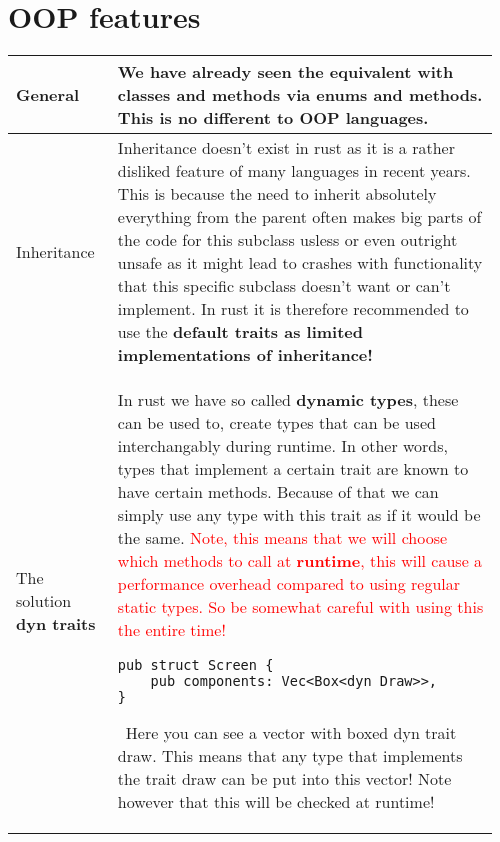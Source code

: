 \documentclass[main.tex,fontsize=8pt,paper=a4,paper=portrait,DIV=calc,]{scrartcl}
\begin{document}
\begin{table}[ht!]
\section{OOP features}
\begin{tabular}{|m{0.2\linewidth}|m{0.755\linewidth}|}
\hline 
General & 
We have already seen the equivalent with classes and methods via enums and methods.\newline
This is no different to OOP languages.\\
\hline
Inheritance & 
Inheritance doesn't exist in rust as it is a rather disliked feature of many languages in recent years.\newline
This is because the need to inherit absolutely everything from the parent often makes big parts of the code for this subclass usless or even outright unsafe as it might lead to crashes with functionality that this specific subclass doesn't want or can't implement.\newline
In rust it is therefore recommended to use the \textbf{default traits as limited implementations of inheritance!}\\
\hline
The solution \textbf{dyn traits}& 
\textcolor{OliveGreen}{In rust we have so called \textbf{dynamic types}, these can be used to, create types that can be used interchangably during runtime. In other words, types that implement a certain trait are known to have certain methods. Because of that we can simply use any type with this trait as if it would be the same.}\newline
\textcolor{red}{Note, this means that we will choose which methods to call at \textbf{runtime}, this will cause a performance overhead compared to using regular static types. So be somewhat careful with using this the entire time!}\newline 
\begin{lstlisting}
pub struct Screen {
    pub components: Vec<Box<dyn Draw>>,
}
\end{lstlisting} 
\, \newline
Here you can see a vector with boxed dyn trait draw.\newline
This means that any type that implements the trait draw can be put into this vector!\newline
Note however that this will be checked at runtime!\\
\hline
\end{tabular}
\end{table}
\pagebreak
\end{document}
